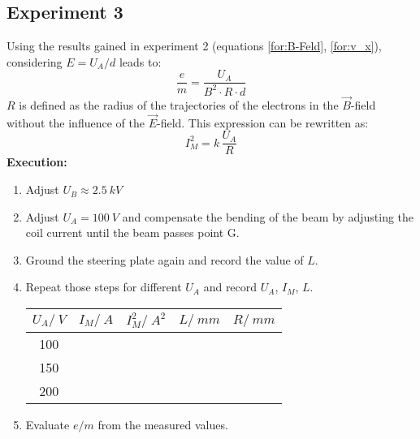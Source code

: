 \documentclass{tudphygp_eng}
\begin{document}
\subsection{Experiment 3}
  Using the results gained in experiment 2 (equations \eqref{for:B-Feld}, \eqref{for:v_x}), considering $E=U_A/d$ leads to:
  \begin{equation}
    \frac{e}{m} = \frac{U_A}{B^2\cdot R\cdot d}
  \end{equation}
  $R$ is defined as the radius of the trajectories of the electrons in the $\vec B$-field without the influence of the $\vec E$-field. This expression can be rewritten as:
  \begin{equation}
    I_M^2 = k\,\frac{U_A}{R}
  \end{equation}
  \textbf{Execution:}
  \begin{enumerate}
    \item Adjust $U_B \approx \SI{2.5}{kV}$
    \item Adjust $U_A = \SI{100}{V}$ and compensate the bending of the beam by adjusting the coil current until the beam passes point G.
    \item Ground the steering plate again and record the value of $L$.
    \item Repeat those steps for different $U_A$ and record $U_A$, $I_M$, $L$.\\[1em]
    \begin{tabular}{|c|c|c|c|c|}\hline
      $U_A/\SI{}{V}$ & \hspace{10pt}$I_M/\SI{}{A}$\hspace{10pt} & \hspace{10pt}$I_M^2/\SI{}{A^2}$\hspace{10pt} & \hspace{10pt}$L/\SI{}{mm}$\hspace{10pt} & \hspace{10pt}$R/\SI{}{mm}$\hspace{10pt} \\\hline
      100 & & & &\\
      150 & & & &\\
      200 & & & &\\\hline
    \end{tabular}
    \item Evaluate $e/m$ from the measured values.
  \end{enumerate}
  
\end{document}
